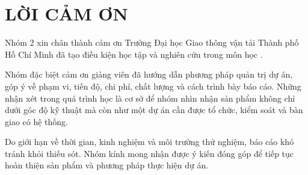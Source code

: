 \chapter*{LỜI CẢM ƠN}

Nhóm 2 xin chân thành cảm ơn Trường Đại học Giao thông vận tải Thành phố Hồ Chí Minh đã tạo điều kiện học tập và nghiên cứu trong môn học \coursename.

Nhóm đặc biệt cảm ơn giảng viên \supervisor{} đã hướng dẫn phương pháp quản trị dự án, góp ý về phạm vi, tiến độ, chi phí, chất lượng và cách trình bày báo cáo. Những nhận xét trong quá trình học là cơ sở để nhóm nhìn nhận sản phẩm không chỉ dưới góc độ kỹ thuật mà còn như một dự án cần được tổ chức, kiểm soát và bàn giao có hệ thống.

Do giới hạn về thời gian, kinh nghiệm và môi trường thử nghiệm, báo cáo khó tránh khỏi thiếu sót. Nhóm kính mong nhận được ý kiến đóng góp để tiếp tục hoàn thiện sản phẩm và phương pháp thực hiện dự án.
